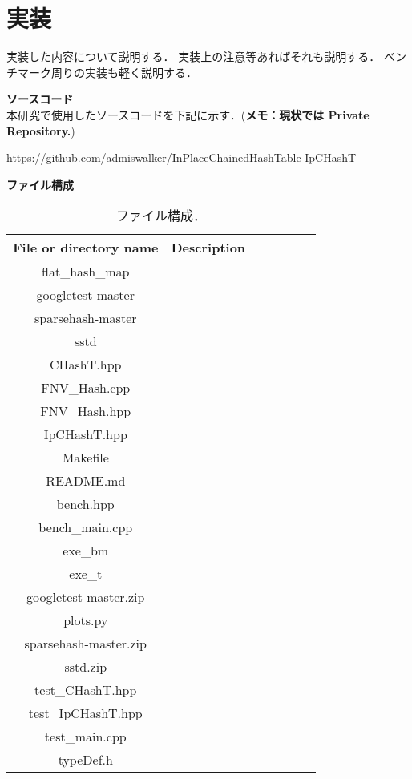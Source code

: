 \chapter{実装}
\label{chap_Implementation}

実装した内容について説明する．
実装上の注意等あればそれも説明する．
ベンチマーク周りの実装も軽く説明する．
\leavevmode \newline

{\bf ソースコード}
\samepage \\ \indent
本研究で使用したソースコードを下記に示す．({\bf \color{red}メモ：現状では Private Repository.})
\begin{center}
  \url{https://github.com/admiswalker/InPlaceChainedHashTable-IpCHashT-}
\end{center}

{\bf ファイル構成}
\samepage \\ \indent
\begin{table}[hbtp]
  \begin{center}
    \fontsize{9pt}{10pt}\selectfont
    \caption{ファイル構成．}
    \begin{tabular}{ccccccc} \hline
      File or directory name & Description \rule[0pt]{0pt}{10pt} \\ \hline
      flat\_hash\_map        &  \\ 
      googletest-master      &  \\
      sparsehash-master      &  \\
      sstd                   &  \\
      CHashT.hpp             &  \\
      FNV\_Hash.cpp          &  \\
      FNV\_Hash.hpp          &  \\
      IpCHashT.hpp           &  \\
      Makefile               &  \\
      README.md              &  \\
      bench.hpp              &  \\
      bench\_main.cpp        &  \\
      exe\_bm                &  \\
      exe\_t                 &  \\
      googletest-master.zip  &  \\
      plots.py               &  \\
      sparsehash-master.zip  &  \\
      sstd.zip               &  \\
      test\_CHashT.hpp       &  \\
      test\_IpCHashT.hpp     &  \\
      test\_main.cpp         &  \\
      typeDef.h              &  \\ \hline
    \end{tabular}
    \label{table_fileDesc}
  \end{center}
\end{table}



